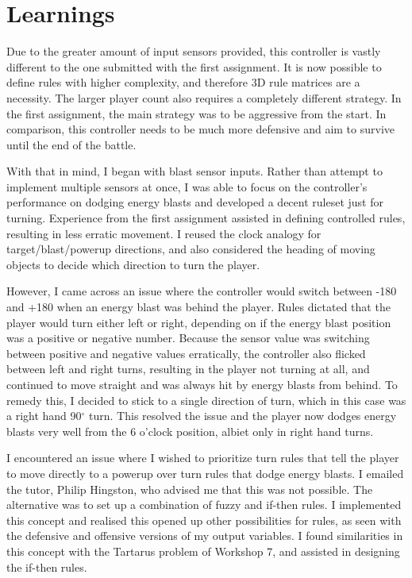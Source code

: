 \section{Learnings}

Due to the greater amount of input sensors provided, this controller is vastly different to the one submitted with the first assignment. It is now possible to define rules with higher complexity, and therefore 3D rule matrices are a necessity. The larger player count also requires a completely different strategy. In the first assignment, the main strategy was to be aggressive from the start. In comparison, this controller needs to be much more defensive and aim to survive until the end of the battle.

With that in mind, I began with blast sensor inputs. Rather than attempt to implement multiple sensors at once, I was able to focus on the controller's performance on dodging energy blasts and developed a decent ruleset just for turning. Experience from the first assignment assisted in defining controlled rules, resulting in less erratic movement. I reused the clock analogy for target/blast/powerup directions, and also considered the heading of moving objects to decide which direction to turn the player. 

However, I came across an issue where the controller would switch between -180 and +180 when an energy blast was behind the player. Rules dictated that the player would turn either left or right, depending on if the energy blast position was a positive or negative number. Because the sensor value was switching between positive and negative values erratically, the controller also flicked between left and right turns, resulting in the player not turning at all, and continued to move straight and was always hit by energy blasts from behind. To remedy this, I decided to stick to a single direction of turn, which in this case was a right hand 90$^{\circ}$ turn. This resolved the issue and the player now dodges energy blasts very well from the 6 o'clock position, albiet only in right hand turns.

I encountered an issue where I wished to prioritize turn rules that tell the player to move directly to a powerup over turn rules that dodge energy blasts. I emailed the tutor, Philip Hingston, who advised me that this was not possible. The alternative was to set up a combination of fuzzy and if-then rules. I implemented this concept and realised this opened up other possibilities for rules, as seen with the defensive and offensive versions of my output variables. I found similarities in this concept with the Tartarus problem of Workshop 7, and assisted in designing the if-then rules.

